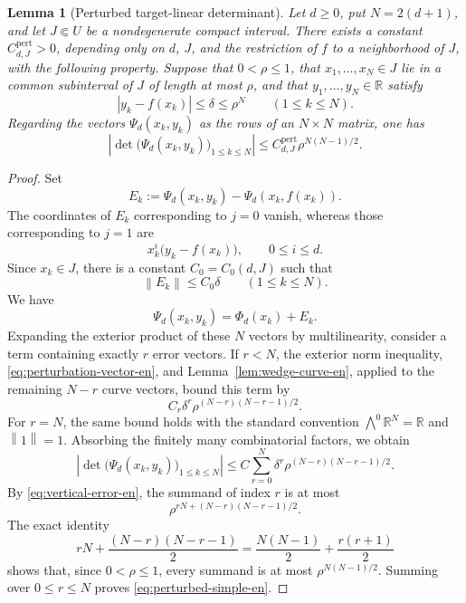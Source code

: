 \documentclass[11pt]{amsart}
\numberwithin{equation}{section}
\newtheorem{lemma}[lemma]{Lemma}
\theoremstyle{definition}
\theoremstyle{remark}
\newcommand{\R}{\mathbb R}
\newcommand{\norm}[1]{\left\lVert #1\right\rVert}
\newcommand{\abs}[1]{\left\lvert #1\right\rvert}
\begin{document}
\begin{lemma}[Perturbed target-linear determinant]
\label{lem:perturbed-determinant-en}
Let $d\geq0$, put $N=2(d+1)$, and let $J\Subset U$ be a nondegenerate compact
interval. There exists a constant $C_{d,J}^{\mathrm{pert}}>0$, depending
only on $d$, $J$, and the restriction of $f$ to a neighborhood of $J$,
with the following property. Suppose that $0<\rho\leq1$, that
$x_1,\ldots,x_N\in J$ lie in a common subinterval of $J$ of length at
most $\rho$, and that $y_1,\ldots,y_N\in\R$ satisfy
\begin{equation}\label{eq:vertical-error-en}
\abs{y_k-f(x_k)}\leq\delta\leq\rho^N
\qquad(1\leq k\leq N).
\end{equation}
Regarding the vectors $\Psi_d(x_k,y_k)$ as the rows of an
$N\times N$ matrix, one has
\begin{equation}\label{eq:perturbed-simple-en}
\abs{\det\bigl(\Psi_d(x_k,y_k)\bigr)_{1\leq k\leq N}}
\leq
C_{d,J}^{\mathrm{pert}}\rho^{N(N-1)/2}.
\end{equation}
\end{lemma}

\begin{proof}
Set
\[
E_k:=\Psi_d(x_k,y_k)-\Psi_d(x_k,f(x_k)).
\]
The coordinates of $E_k$ corresponding to $j=0$ vanish, whereas those
corresponding to $j=1$ are
\[
x_k^i\bigl(y_k-f(x_k)\bigr),
\qquad0\leq i\leq d.
\]
Since $x_k\in J$, there is a constant $C_0=C_0(d,J)$ such that
\begin{equation}\label{eq:perturbation-vector-en}
\norm{E_k}\leq C_0\delta
\qquad(1\leq k\leq N).
\end{equation}
We have
\[
\Psi_d(x_k,y_k)=\Phi_d(x_k)+E_k.
\]
Expanding the exterior product of these $N$ vectors by multilinearity,
consider a term containing exactly $r$ error vectors. If $r<N$, the
exterior norm inequality, \eqref{eq:perturbation-vector-en}, and
Lemma~\ref{lem:wedge-curve-en}, applied to the remaining $N-r$ curve
vectors, bound this term by
\[
C_r\delta^r\rho^{(N-r)(N-r-1)/2}.
\]
For $r=N$, the same bound holds with the standard convention
$\bigwedge^0\R^N=\R$ and $\norm{1}=1$. Absorbing the finitely many
combinatorial factors, we obtain
\begin{equation}\label{eq:perturbed-general-en}
\abs{\det\bigl(\Psi_d(x_k,y_k)\bigr)_{1\leq k\leq N}}
\leq
C\sum_{r=0}^N
\delta^r\rho^{(N-r)(N-r-1)/2}.
\end{equation}
By \eqref{eq:vertical-error-en}, the summand of index $r$ is at most
\[
\rho^{rN+(N-r)(N-r-1)/2}.
\]
The exact identity
\begin{equation}\label{eq:exponent-identity-en}
rN+\frac{(N-r)(N-r-1)}{2}
=
\frac{N(N-1)}{2}+\frac{r(r+1)}{2}
\end{equation}
shows that, since $0<\rho\leq1$, every summand is at most
$\rho^{N(N-1)/2}$. Summing over $0\leq r\leq N$ proves
\eqref{eq:perturbed-simple-en}.
\end{proof}
\end{document}
